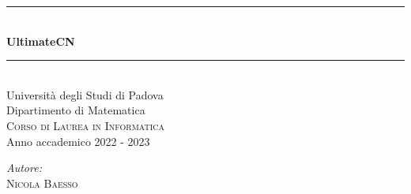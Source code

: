 \documentclass[12pt,a4paper,headings=optiontohead]{article}
\begin{document}

\begin{titlepage}

\newcommand{\HRule}{\rule{\linewidth}{0.5mm}} %

\center %
 



\HRule \\[0.4cm]
{ \huge \bfseries UltimateCN}\\
\HRule \\[1.5cm]
 



\LARGE Università degli Studi di Padova\\[0.4cm] %
{\large Dipartimento di Matematica}\\[0.05cm]
\textsc{\large Corso di Laurea in Informatica}\\[1cm] %

{\Large Anno accademico 2022 - 2023}\\[2cm] %
\begin{minipage}{0.4\textwidth}
	\begin{flushleft} \large
		\emph{\Large{Autore:}}\\
		\quad \quad \textsc{Nicola Baesso}
	\end{flushleft}
	
\end{minipage}\\[3cm]

\vfill %

\end{titlepage}
\end{document}
